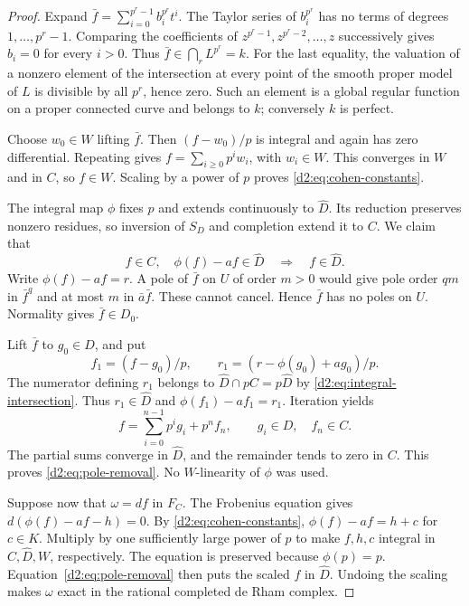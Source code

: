 \documentclass[11pt,a4paper]{amsart}
\numberwithin{equation}{section}
\theoremstyle{definition}
\theoremstyle{remark}
\newcommand{\Dtwowh}{\widehat}
\begin{document}
\begin{proof}
Expand \(\bar f=\sum_{i=0}^{p^r-1}b_i^{p^r}t^i\).
The Taylor series of \(b_i^{p^r}\) has no terms of degrees
\(1,\ldots,p^r-1\).
Comparing the coefficients of \(z^{p^r-1},z^{p^r-2},\ldots,z\)
successively gives \(b_i=0\) for every \(i>0\).
Thus \(\bar f\in\bigcap_rL^{p^r}=k\).
For the last equality, the valuation of a nonzero element of the
intersection at every point of the smooth proper model of \(L\) is
divisible by all \(p^r\), hence zero.
Such an element is a global regular function on a proper connected
curve and belongs to \(k\); conversely \(k\) is perfect.

Choose \(w_0\in W\) lifting \(\bar f\).
Then \((f-w_0)/p\) is integral and again has zero differential.
Repeating gives \(f=\sum_{i\ge0}p^iw_i\), with \(w_i\in W\).
This converges in \(W\) and in \(C\), so \(f\in W\).
Scaling by a power of \(p\) proves \eqref{d2:eq:cohen-constants}.

The integral map \(\phi\) fixes \(p\) and extends continuously to
\(\Dtwowh D\). Its reduction preserves nonzero residues, so inversion
of \(S_D\) and completion extend it to \(C\).
We claim that
\begin{equation}\label{d2:eq:pole-removal}
 f\in C,\quad \phi(f)-af\in\Dtwowh D
 \quad\Longrightarrow\quad f\in\Dtwowh D.
\end{equation}
Write \(\phi(f)-af=r\).
A pole of \(\bar f\) on \(U\) of order \(m>0\) would give pole
order \(qm\) in \(\bar f^q\) and at most \(m\) in
\(\bar a\bar f\). These cannot cancel.
Hence \(\bar f\) has no poles on \(U\).
Normality gives \(\bar f\in D_0\).

Lift \(\bar f\) to \(g_0\in D\), and put
\[
 f_1=(f-g_0)/p,\qquad
 r_1=(r-\phi(g_0)+ag_0)/p.
\]
The numerator defining \(r_1\) belongs to
\(\Dtwowh D\cap pC=p\Dtwowh D\) by \eqref{d2:eq:integral-intersection}.
Thus \(r_1\in\Dtwowh D\) and \(\phi(f_1)-af_1=r_1\).
Iteration yields
\[
 f=\sum_{i=0}^{n-1}p^ig_i+p^nf_n,
 \qquad g_i\in D,\quad f_n\in C.
\]
The partial sums converge in \(\Dtwowh D\), and the remainder tends to
zero in \(C\). This proves \eqref{d2:eq:pole-removal}.
No \(W\)-linearity of \(\phi\) was used.

Suppose now that \(\omega=df\) in \(F_C\).
The Frobenius equation gives
\(d(\phi(f)-af-h)=0\).
By \eqref{d2:eq:cohen-constants},
\(\phi(f)-af=h+c\) for \(c\in K\).
Multiply by one sufficiently large power of \(p\) to make
\(f,h,c\) integral in \(C,\Dtwowh D,W\), respectively.
The equation is preserved because \(\phi(p)=p\).
Equation~\eqref{d2:eq:pole-removal} then puts the scaled \(f\) in
\(\Dtwowh D\). Undoing the scaling makes \(\omega\) exact in the
rational completed de Rham complex.


\end{proof}
\end{document}
